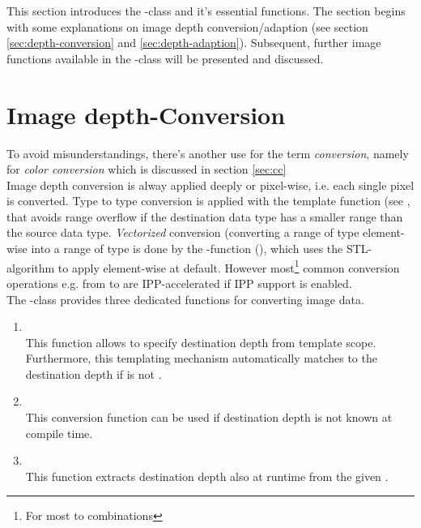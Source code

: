 This section introduces the -class and it's essential functions. The section begins with some explanations on image depth conversion/adaption (see section \ref{sec:depth-conversion} and \ref{sec:depth-adaption}). Subsequent, further image functions available in the -class will be presented and discussed. 

\section {\label{sec:depth-conversion}Image depth-Conversion}
To avoid misunderstandings, there's another use for the term \emph{conversion}, namely for \emph{color conversion} which is discussed in section \ref{sec:cc}\\
Image depth conversion is alway applied deeply or pixel-wise, i.e. each single pixel is converted. Type to type conversion is applied with the  template function (see , that avoids range overflow if the destination data type has a smaller range than the source data type. \emph{Vectorized} conversion (converting a range of type  element-wise into a range of type  is done by the -function (), which uses the STL-algorithm  to apply  element-wise at default. However most\footnote{For most  to  combinations} common conversion operations e.g. from  to  are IPP-accelerated if IPP support is enabled.\\
The -class provides three dedicated  functions for converting image data. 
\begin{enumerate}
\item {}\\
This function allows to specify destination depth from template scope. Furthermore, this templating mechanism automatically matches to the destination depth if  is not .
\item {}\\
This conversion function can be used if destination depth is not known at compile time.
\item {}\\
This function extracts destination depth also at runtime from the given .      
\end{enumerate}


